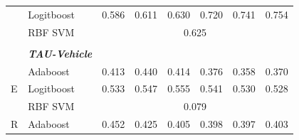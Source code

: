 \documentclass[12pt]{article}
\begin{document}
\begin{sloppypar}
\begin{table}[hbt!]
\begin{tabular}{lllllllll}
                                       & \multicolumn{2}{l}{Logitboost}                            & 0.586                           & 0.611                            & 0.630                            & 0.720                           & 0.741                            & 0.754                            \\
                                       & \multicolumn{2}{l}{RBF SVM}                               & \multicolumn{6}{c}{0.625}                                                                                                                                                                                     \\
                                       &                 &                                         &                                 &                                  &                                  &                                 &                                  &                                  \\
                                       & \multicolumn{2}{l}{\textit{\textbf{TAU-Vehicle}}}         &                                 &                                  &                                  &                                 &                                  &                                  \\
\multirow{3}{*}{E}                     & \multicolumn{2}{l}{Adaboost}                              & 0.413                           & 0.440                            & 0.414                            & 0.376                           & 0.358                            & 0.370                            \\
                                       & \multicolumn{2}{l}{Logitboost}                            & 0.533                           & 0.547                            & 0.555                            & 0.541                           & 0.530                            & 0.528                            \\
                                       & \multicolumn{2}{l}{RBF SVM}                               & \multicolumn{6}{c}{0.079}                                                                                                                                                                                   \\
\multirow{3}{*}{R}                     & \multicolumn{2}{l}{Adaboost}                              & 0.452                           & 0.425                            & 0.405                            & 0.398                           & 0.397                            & 0.403                            \\

\end{tabular}
\end{table}
\end{sloppypar}
\end{document}
